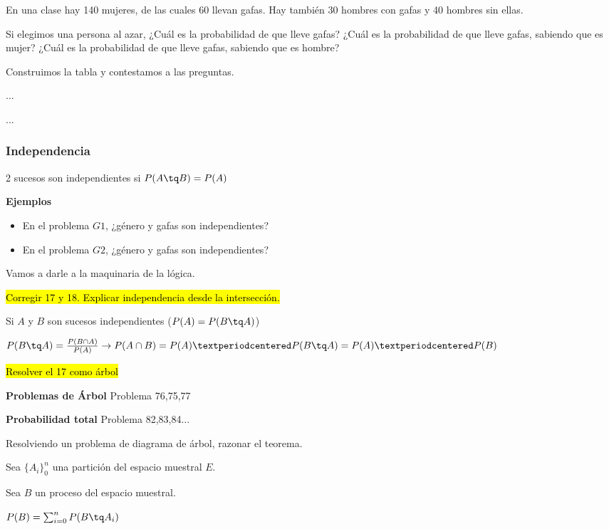 \begin{problem}[G2]
En una clase hay 140 mujeres, de las cuales 60 llevan gafas. Hay también 30 hombres con gafas y 40 hombres sin ellas.

Si elegimos una persona al azar,
\ppart ¿Cuál es la probabilidad de que lleve gafas?
\ppart ¿Cuál es la probabilidad de que lleve gafas, sabiendo que es mujer?
\ppart ¿Cuál es la probabilidad de que lleve gafas, sabiendo que es hombre?

\solution

\spart Construimos la tabla y contestamos a las preguntas.

\spart ...

\spart ...

\end{problem}

\subsubsection{Independencia}

\begin{defn}[Independencia]
2 sucesos son independientes si $P(A \tq B) = P(A)$
\end{defn}

\textbf{Ejemplos}
\begin{itemize}
	\item En el problema $G1$, ¿género y gafas son independientes?
	\item En el problema $G2$, ¿género y gafas son independientes?
\end{itemize}

Vamos a darle a la maquinaria de la lógica.


\hl{Corregir 17 y 18. 
Explicar independencia desde la intersección.
}
\begin{corol}
Si $A$ y $B$ son sucesos independientes ($P(A) = P(B\tq A)$)

$P(B\tq A) = \frac{P(B\cap A)}{P(A)} \to P(A\cap B) = P(A) · P(B\tq A) = P(A) · P(B)$
\end{corol}



\hl{Resolver el 17 como árbol}

\textbf{Problemas de Árbol}
Problema 76,75,77

\textbf{Probabilidad total}
Problema 82,83,84...

Resolviendo un problema de diagrama de árbol, razonar el teorema.
\begin{theorem}
Sea $\{A_i\}_0^n$ una partición del espacio muestral $E$.

Sea $B$ un proceso del espacio muestral.

$P(B) = \sum_{i=0}^n P(B\tq A_i)$
\end{theorem}


